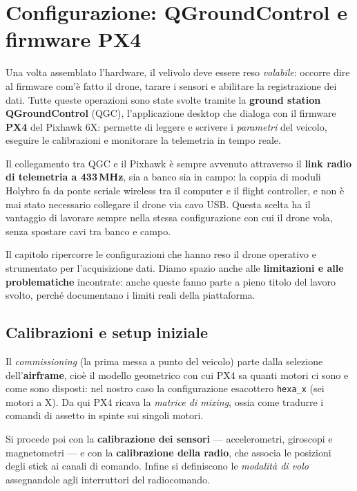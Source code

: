 \chapter{Configurazione: QGroundControl e firmware PX4}
\label{cap:configurazione}

Una volta assemblato l'hardware, il velivolo deve essere reso \emph{volabile}:
occorre dire al firmware com'\`e fatto il drone, tarare i sensori e abilitare la
registrazione dei dati. Tutte queste operazioni sono state svolte tramite la
\textbf{ground station QGroundControl} (QGC), l'applicazione desktop che dialoga
con il firmware \textbf{PX4} del Pixhawk 6X: permette di leggere e scrivere i
\emph{parametri} del veicolo, eseguire le calibrazioni e monitorare la telemetria
in tempo reale.

Il collegamento tra QGC e il Pixhawk \`e sempre avvenuto attraverso il
\textbf{link radio di telemetria a 433\,MHz}, sia a banco sia in campo: la coppia
di moduli Holybro fa da ponte seriale wireless tra il computer e il flight
controller, e non \`e mai stato necessario collegare il drone via cavo USB. Questa
scelta ha il vantaggio di lavorare sempre nella stessa configurazione con cui il
drone vola, senza spostare cavi tra banco e campo.

Il capitolo ripercorre le configurazioni che hanno reso il drone operativo e
strumentato per l'acquisizione dati. Diamo spazio anche alle \textbf{limitazioni
e alle problematiche} incontrate: anche queste fanno parte a pieno titolo del
lavoro svolto, perch\'e documentano i limiti reali della piattaforma.

\section{Calibrazioni e setup iniziale}

Il \emph{commissioning} (la prima messa a punto del veicolo) parte dalla
selezione dell'\textbf{airframe}, cio\`e il modello geometrico con cui PX4 sa
quanti motori ci sono e come sono disposti: nel nostro caso la configurazione
esacottero \texttt{hexa\_x} (sei motori a X). Da qui PX4 ricava la
\emph{matrice di mixing}, ossia come tradurre i comandi di assetto in spinte sui
singoli motori.

Si procede poi con la \textbf{calibrazione dei sensori} --- accelerometri,
giroscopi e magnetometri --- e con la \textbf{calibrazione della radio}, che
associa le posizioni degli stick ai canali di comando. Infine si definiscono le
\emph{modalit\`a di volo} assegnandole agli interruttori del radiocomando.

